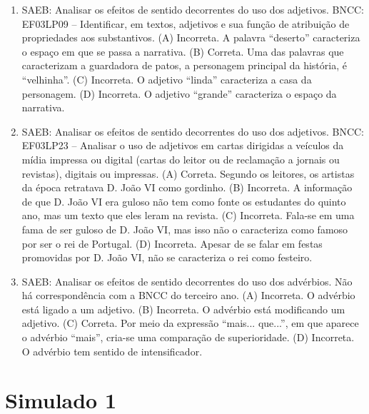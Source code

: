 \begin{enumerate}
\item
SAEB: Analisar os efeitos de sentido decorrentes do uso dos adjetivos.
BNCC: EF03LP09 -- Identificar, em textos, adjetivos e sua função de
atribuição de propriedades aos substantivos.
(A) Incorreta. A palavra ``deserto'' caracteriza o espaço em que se
passa a narrativa.
(B) Correta. Uma das palavras que caracterizam a
guardadora de patos, a personagem principal da história, é ``velhinha''.
(C) Incorreta. O adjetivo ``linda'' caracteriza a casa da personagem.
(D) Incorreta. O adjetivo ``grande'' caracteriza o espaço da narrativa.

\item
SAEB: Analisar os efeitos de sentido decorrentes do uso dos adjetivos.
BNCC: EF03LP23 -- Analisar o uso de adjetivos em cartas dirigidas a
veículos da mídia impressa ou digital (cartas do leitor ou de reclamação
a jornais ou revistas), digitais ou impressas.
(A) Correta. Segundo os leitores, os artistas da época retratava D. João VI como gordinho.
(B) Incorreta. A informação de que D. João VI era guloso não tem como fonte os estudantes do quinto ano, mas um texto que eles leram na revista.
(C) Incorreta. Fala-se em uma fama de ser guloso de D. João VI, mas isso não o caracteriza como famoso por ser o rei de Portugal.
(D) Incorreta. Apesar de se falar em festas promovidas por D. João VI, não se caracteriza o rei como festeiro.

\item
SAEB: Analisar os efeitos de sentido decorrentes do uso dos advérbios.
Não há correspondência com a BNCC do terceiro ano.
(A) Incorreta. O advérbio está ligado a um adjetivo.
(B) Incorreta. O advérbio está modificando um adjetivo.
(C) Correta. Por meio da expressão ``mais... que...'', em que aparece o advérbio ``mais'', cria-se uma comparação de superioridade.
(D) Incorreta. O advérbio tem sentido de intensificador.
\end{enumerate}

\section*{Simulado 1}

